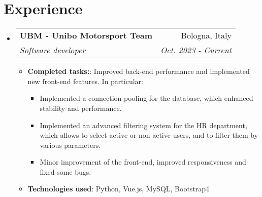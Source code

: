 \documentclass[letterpaper,11pt]{article}
\makeatletter
\newcommand{\resumeItem}[2]{
  \item\small{
    \textbf{#1}{: #2 \vspace{-2pt}}
  }
}
\newcommand{\resumeSubheading}[4]{
  \vspace{-1pt}\item
    \begin{tabular*}{0.97\textwidth}{l@{\extracolsep{\fill}}r}
      \textbf{#1} & #2 \\
      \textit{\small#3} & \textit{\small #4} \\
    \end{tabular*}\vspace{-5pt}
}
\newcommand{\resumeSubHeadingListStart}{\begin{itemize}[leftmargin=*]}
\newcommand{\resumeSubHeadingListEnd}{\end{itemize}}
\newcommand{\resumeItemListStart}{\begin{itemize}}
\newcommand{\resumeItemListEnd}{\end{itemize}\vspace{-5pt}}
\makeatother
\begin{document}
\section{Experience}
\resumeSubHeadingListStart
    \resumeSubheading{UBM - Unibo Motorsport Team}{Bologna, Italy}{Software developer}{Oct. 2023 - Current}
    \resumeItemListStart
        \resumeItem{Completed tasks:} {Improved back-end performance and implemented new front-end features.\newline
        In particular:}
        \resumeItemListStart
            \item{Implemented a connection pooling for the database, which enhanced stability and performance.}
            \item{Implemented an advanced filtering system for the HR department, which allows to select active or non active users, and to filter them by various parameters.}
            \item{Minor improvement of the front-end, improved responsiveness and fixed some bugs.}
        \resumeItemListEnd
        \resumeItem{Technologies used} {Python, Vue.js, MySQL, Bootstrap4}
    \resumeItemListEnd
\resumeSubHeadingListEnd
\end{document}

